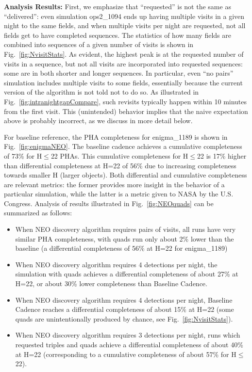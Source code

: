 \documentclass[manuscript]{article}
\begin{document}
{\bf Analysis Results:}  
First, we emphasize that ``requested'' is not the same as ``delivered'': even simulation
ops2\_1094 ends up having multiple visits in a given night to the same fields, and when
multiple visits per night are requested, not all fields get to have completed sequences.
The statistics of how many fields are combined into sequences of a given number of 
visits is shown in Fig.~\ref{fig:NvisitStats}.  As evident, the highest peak is at the 
requested number of visits in a sequence, but not all visits are incorporated into
requested sequences: some are in both shorter and longer sequences. In particular,
even ``no pairs'' simulation includes multiple visits to some fields, essentially because
the current version of the algorithm is not told not to do so. As illustrated in 
Fig.~\ref{fig:intranightgapCompare}, such revisits typically happen within 10 minutes
from the first visit. This (unintended) behavior implies that the naive expectation above
is probably incorrect, as we discuss in more detail below. 



For baseline reference, the PHA completeness for enigma\_1189 is shown in Fig.~\ref{fig:enigmaNEO}. 
The baseline cadence achieves a cumulative completeness of 73\% for H$\le$22 PHAs. This 
cumulative completeness for H$\le$22 is 17\% higher than differential completeness at H=22 
of 56\% due to increasing completeness towards smaller H (larger objects). Both differential
and cumulative completeness are relevant metrics: the former provides more insight in the
behavior of a particular simulation, while the latter is a metric given to NASA by the U.S. Congress.
Analysis of results illustrated in Fig.~\ref{fig:NEOquads} can be summarized as follows:
\begin{itemize}
\item When NEO discovery algorithm requires pairs of visits, all runs have very similar PHA
completeness, with quads run only about 2\% lower than the baseline (a differential completeness
of 56\% at H=22 for enigma\_1189) 
\item When NEO discovery algorithm requires 4 detections per night, the simulation with 
quads achieves a differential completeness of about 27\% at H=22, or  about 30\% lower 
completeness than Baseline Cadence. 
\item When NEO discovery algorithm requires 4 detections per night, Baseline Cadence
reaches a differential completeness of about 15\% at H=22 (some quads are unintentionally 
produced by chance, see Fig.~\ref{fig:NvisitStats}). 
\item When NEO discovery algorithm requires 3 detections per night,  runs which requested 
triples and quads achieve a differential completeness of about 40\% at H=22 (corresponding
to a cumulative completeness of about 57\% for H$\le$22). 
\end{itemize}
\end{document}
